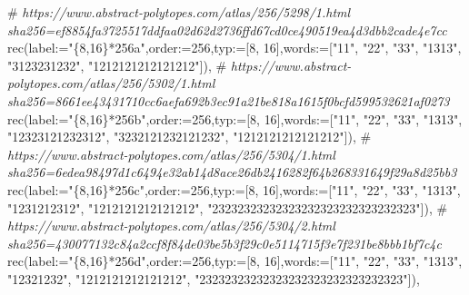 \documentclass[
  10pt,
  letterpaper,
]{article}
\newenvironment{Shaded}{}{}
\newcommand{\CommentTok}[1]{\textcolor[rgb]{0.38,0.63,0.69}{\textit{#1}}}
\newcommand{\ExtensionTok}[1]{#1}
\newcommand{\FloatTok}[1]{\textcolor[rgb]{0.25,0.63,0.44}{#1}}
\newcommand{\NormalTok}[1]{#1}
\newcommand{\OperatorTok}[1]{\textcolor[rgb]{0.40,0.40,0.40}{#1}}
\newcommand{\StringTok}[1]{\textcolor[rgb]{0.25,0.44,0.63}{#1}}
\newcommand{\VariableTok}[1]{\textcolor[rgb]{0.10,0.09,0.49}{#1}}
\begin{document}
\begin{Shaded}
\begin{Highlighting}[]
\NormalTok{\#}\CommentTok{ https://www.abstract{-}polytopes.com/atlas/256/5298/1.html sha256=ef8854fa3725517ddfaa02d62d2736ffd67cd0ce490519ea4d3dbb2cade4e7cc}
\ExtensionTok{rec}\NormalTok{(}\VariableTok{label}\OperatorTok{:=}\StringTok{"\{8,16\}*256a"}\OperatorTok{,}\VariableTok{order}\OperatorTok{:=}\FloatTok{256}\OperatorTok{,}\VariableTok{typ}\OperatorTok{:=}\NormalTok{[}\FloatTok{8}\OperatorTok{,} \FloatTok{16}\NormalTok{]}\OperatorTok{,}\VariableTok{words}\OperatorTok{:=}\NormalTok{[}\StringTok{"11"}\OperatorTok{,} \StringTok{"22"}\OperatorTok{,} \StringTok{"33"}\OperatorTok{,} \StringTok{"1313"}\OperatorTok{,} \StringTok{"3123231232"}\OperatorTok{,} \StringTok{"1212121212121212"}\NormalTok{])}\OperatorTok{,}
\NormalTok{\#}\CommentTok{ https://www.abstract{-}polytopes.com/atlas/256/5302/1.html sha256=8661ee43431710cc6aefa692b3ec91a21be818a1615f0bcfd599532621af0273}
\ExtensionTok{rec}\NormalTok{(}\VariableTok{label}\OperatorTok{:=}\StringTok{"\{8,16\}*256b"}\OperatorTok{,}\VariableTok{order}\OperatorTok{:=}\FloatTok{256}\OperatorTok{,}\VariableTok{typ}\OperatorTok{:=}\NormalTok{[}\FloatTok{8}\OperatorTok{,} \FloatTok{16}\NormalTok{]}\OperatorTok{,}\VariableTok{words}\OperatorTok{:=}\NormalTok{[}\StringTok{"11"}\OperatorTok{,} \StringTok{"22"}\OperatorTok{,} \StringTok{"33"}\OperatorTok{,} \StringTok{"1313"}\OperatorTok{,} \StringTok{"12323121232312"}\OperatorTok{,} \StringTok{"3232121232121232"}\OperatorTok{,} \StringTok{"1212121212121212"}\NormalTok{])}\OperatorTok{,}
\NormalTok{\#}\CommentTok{ https://www.abstract{-}polytopes.com/atlas/256/5304/1.html sha256=6edea98497d1c6494e32ab14d8ace26db2416282f64b268331649f29a8d25bb3}
\ExtensionTok{rec}\NormalTok{(}\VariableTok{label}\OperatorTok{:=}\StringTok{"\{8,16\}*256c"}\OperatorTok{,}\VariableTok{order}\OperatorTok{:=}\FloatTok{256}\OperatorTok{,}\VariableTok{typ}\OperatorTok{:=}\NormalTok{[}\FloatTok{8}\OperatorTok{,} \FloatTok{16}\NormalTok{]}\OperatorTok{,}\VariableTok{words}\OperatorTok{:=}\NormalTok{[}\StringTok{"11"}\OperatorTok{,} \StringTok{"22"}\OperatorTok{,} \StringTok{"33"}\OperatorTok{,} \StringTok{"1313"}\OperatorTok{,} \StringTok{"1231212312"}\OperatorTok{,} \StringTok{"1212121212121212"}\OperatorTok{,} \StringTok{"23232323232323232323232323232323"}\NormalTok{])}\OperatorTok{,}
\NormalTok{\#}\CommentTok{ https://www.abstract{-}polytopes.com/atlas/256/5304/2.html sha256=430077132c84a2ccf8f84de03be5b3f29c0e5114715f3e7f231be8bbb1bf7c4c}
\ExtensionTok{rec}\NormalTok{(}\VariableTok{label}\OperatorTok{:=}\StringTok{"\{8,16\}*256d"}\OperatorTok{,}\VariableTok{order}\OperatorTok{:=}\FloatTok{256}\OperatorTok{,}\VariableTok{typ}\OperatorTok{:=}\NormalTok{[}\FloatTok{8}\OperatorTok{,} \FloatTok{16}\NormalTok{]}\OperatorTok{,}\VariableTok{words}\OperatorTok{:=}\NormalTok{[}\StringTok{"11"}\OperatorTok{,} \StringTok{"22"}\OperatorTok{,} \StringTok{"33"}\OperatorTok{,} \StringTok{"1313"}\OperatorTok{,} \StringTok{"12321232"}\OperatorTok{,} \StringTok{"1212121212121212"}\OperatorTok{,} \StringTok{"23232323232323232323232323232323"}\NormalTok{])}\OperatorTok{,}

\end{Highlighting}
\end{Shaded}
\end{document}
